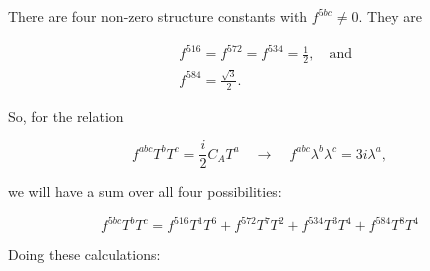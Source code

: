 \section{}

There are four non-zero structure constants with $f^{5bc} \neq 0$. They are

\begin{align}
  &f^{516} = f^{572} = f^{534} = \frac{1}{2}, \quad\mathrm{and} \\
  &f^{584} = \frac{\sqrt{3}}{2}.
\end{align}

So, for the relation

\begin{equation}
  f^{abc}T^bT^c = \frac{i}{2}C_A T^a \quad\rightarrow\quad f^{abc}\lambda^b\lambda^c = 3i\lambda^a,
\end{equation}

we will have a sum over all four possibilities:


\begin{equation}
  f^{5bc}T^bT^c = f^{516}T^1T^6 + f^{572}T^7T^2 + f^{534}T^3T^4 + f^{584}T^8T^4
\end{equation}

Doing these calculations:

